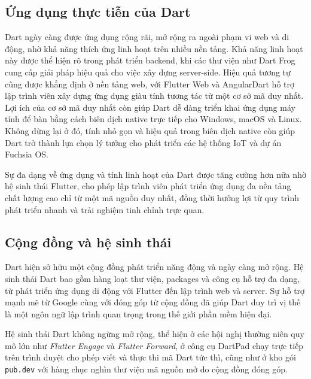 \documentclass[../DoAn.tex]{subfiles}
\numberwithin{figure}{chapter}
\begin{document}
\subsection{Ứng dụng thực tiễn của Dart}

Dart ngày càng được ứng dụng rộng rãi, mở rộng ra ngoài phạm vi web và di động, nhờ khả năng thích ứng linh hoạt trên nhiều nền tảng. Khả năng linh hoạt này được thể hiện rõ trong phát triển backend, khi các thư viện như Dart Frog cung cấp giải pháp hiệu quả cho việc xây dựng server-side. Hiệu quả tương tự cũng được khẳng định ở nền tảng web, với Flutter Web và AngularDart hỗ trợ lập trình viên xây dựng ứng dụng giàu tính tương tác từ một cơ sở mã duy nhất. Lợi ích của cơ sở mã duy nhất còn giúp Dart dễ dàng triển khai ứng dụng máy tính để bàn bằng cách biên dịch native trực tiếp cho Windows, macOS và Linux. Không dừng lại ở đó, tính nhỏ gọn và hiệu quả trong biên dịch native còn giúp Dart trở thành lựa chọn lý tưởng cho phát triển các hệ thống IoT và dự án Fuchsia OS.

Sự đa dạng về ứng dụng và tính linh hoạt của Dart được tăng cường hơn nữa nhờ hệ sinh thái Flutter, cho phép lập trình viên phát triển ứng dụng đa nền tảng chất lượng cao chỉ từ một mã nguồn duy nhất, đồng thời hưởng lợi từ quy trình phát triển nhanh và trải nghiệm tinh chỉnh trực quan.



\subsection{Cộng đồng và hệ sinh thái}
Dart hiện sở hữu một cộng đồng phát triển năng động và ngày càng mở rộng. Hệ sinh thái Dart bao gồm hàng loạt thư viện, packages và công cụ hỗ trợ đa dạng, từ phát triển ứng dụng di động với Flutter đến lập trình web và server. Sự hỗ trợ mạnh mẽ từ Google cùng với đóng góp từ cộng đồng đã giúp Dart duy trì vị thế là một ngôn ngữ lập trình quan trọng trong thế giới phần mềm hiện đại.


Hệ sinh thái Dart không ngừng mở rộng, thể hiện ở các hội nghị thường niên quy mô lớn như \textit{Flutter Engage} và \textit{Flutter Forward}, ở công cụ DartPad chạy trực tiếp trên trình duyệt cho phép viết và thực thi mã Dart tức thì, cũng như ở kho gói \texttt{pub.dev} với hàng chục nghìn thư viện mã nguồn mở do cộng đồng đóng góp.
\end{document}

